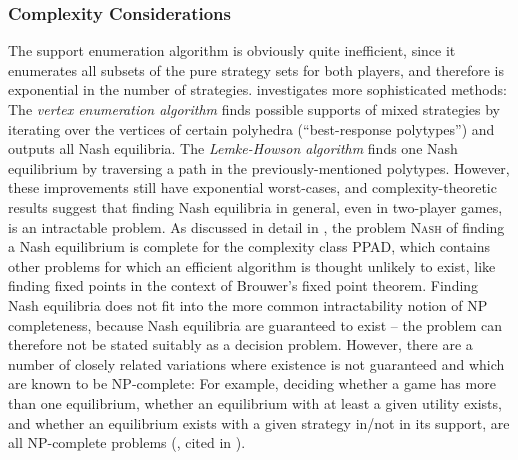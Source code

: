\documentclass[a4paper]{scrreprt}
\begin{document}
    \subsubsection{Complexity Considerations}
    The support enumeration algorithm is obviously quite inefficient, since it enumerates all subsets of the pure strategy sets for both players, and therefore is exponential in the number of strategies.
    \cite{bib:nisanAlgorithmicGameTheoryCh3EquilibriumComputation} investigates more sophisticated methods: The \emph{vertex enumeration algorithm} finds possible supports of mixed strategies by iterating over the vertices of certain polyhedra (“best-response polytypes”) and outputs all Nash equilibria.
    The \emph{Lemke-Howson algorithm} finds one Nash equilibrium by traversing a path in the previously-mentioned polytypes.
    However, these improvements still have exponential worst-cases, and complexity-theoretic results suggest that finding Nash equilibria in general, even in two-player games, is an intractable problem. As discussed in detail in \cite{bib:nisanAlgorithmicGameTheoryCh2ComplexityNash}, the problem \textsc{Nash} of finding a Nash equilibrium is complete for the complexity class PPAD, which contains other problems for which an efficient algorithm is thought unlikely to exist, like finding fixed points in the context of Brouwer's fixed point theorem.
    Finding Nash equilibria does not fit into the more common intractability notion of NP completeness, because Nash equilibria are guaranteed to exist -- the problem can therefore not be stated suitably as a decision problem. However, there are a number of closely related variations where existence is not guaranteed and which are known to be NP-complete: %
    For example, deciding whether a game has more than one equilibrium, whether an equilibrium with at least a given utility exists, and whether an equilibrium exists with a given strategy in/not in its support, are all NP-complete problems (\cite{bib:gilboaEquilibriaComplexityConsiderations}, cited in \cite{bib:nisanAlgorithmicGameTheoryCh2ComplexityNash}).
    
    
    
\end{document}
